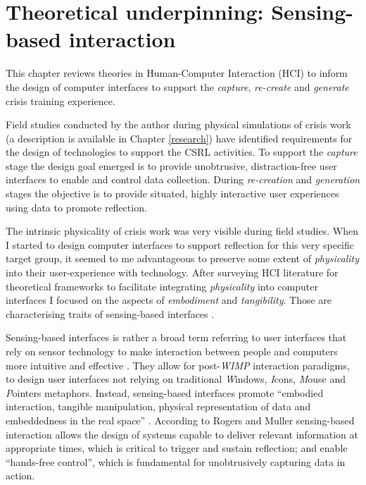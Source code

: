 \chapter[Theoretical underpinning:\\Sensing-based interaction][Sensing-based interaction]{Theoretical underpinning: Sensing-based interaction}\label{interaction}

This chapter reviews theories in Human-Computer Interaction (HCI) to inform the design of computer interfaces to support the \emph{capture}, \emph{re-create} and \emph{generate} crisis training experience.

Field studies conducted by the author during physical simulations of crisis work (a description is available in Chapter \ref{research}) have identified requirements for the design of technologies to support the CSRL activities. To support the \emph{capture} stage the design goal emerged is to provide unobtrusive, distraction-free user interfaces to enable and control data collection. During \emph{re-creation} and \emph{generation} stages the objective is to provide situated, highly interactive user experiences using data to promote reflection.

The intrinsic physicality of crisis work was very visible during field studies. When I started to design computer interfaces to support reflection for this very specific target group, it seemed to me advantageous to preserve some extent of \emph{physicality} into their user-experience with technology. After surveying HCI literature for theoretical frameworks to facilitate integrating \emph{physicality} into computer interfaces I focused on the aspects of \emph{embodiment} and \emph{tangibility}. Those are characterising traits of sensing-based interfaces \autocite{Benford:2005bo}.

Sensing-based interfaces is rather a broad term referring to user interfaces that rely on sensor technology to make interaction between people and computers more intuitive and effective \autocite{Zhai:2005jm}. They allow for post-\emph{WIMP} \autocite{VanDam:1997tz} interaction paradigms, to design user interfaces not relying on traditional \emph{W}indows, \emph{I}cons, \emph{M}ouse and \emph{P}ointers metaphors. Instead, sensing-based interfaces promote ``embodied interaction, tangible manipulation, physical representation of data and embeddedness in the real space'' \autocite{Hornecker:2006uq}. According to Rogers and Muller \autocite*{Rogers:2006te} sensing-based interaction allows the design of systems capable to deliver relevant information at appropriate times, which is critical to trigger and sustain reflection; and enable ``hands-free control'', which is fundamental for unobtrusively capturing data in action.

